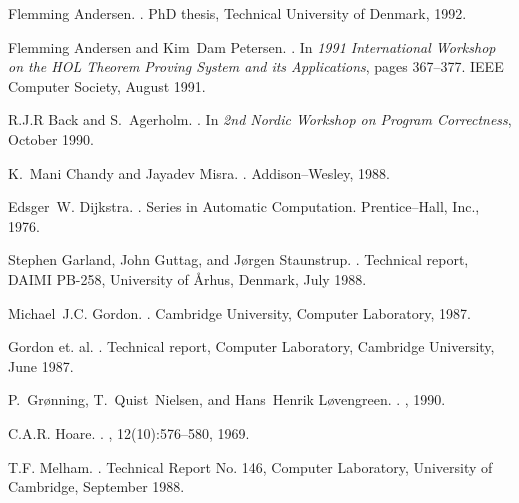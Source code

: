 \cleardoublepage
{}
\begin{thebibliography}{{Gor}87b}

Flemming Andersen.
.
\newblock PhD thesis, Technical University of Denmark, 1992.

Flemming Andersen and Kim~Dam Petersen.
.
\newblock In {\em {1991 International Workshop on the HOL Theorem Proving
  System and its Applications}}, pages 367--377. IEEE Computer Society, August
  1991.

R.J.R Back and S.~Agerholm.
.
\newblock In {\em {2nd Nordic Workshop on Program Correctness}}, October 1990.

K.~Mani Chandy and Jayadev Misra.
.
\newblock Addison--Wesley, 1988.

Edsger~W. Dijkstra.
.
\newblock Series in Automatic Computation. Prentice--Hall, Inc., 1976.

Stephen Garland, John Guttag, and J{\o}rgen Staunstrup.
.
\newblock Technical report, DAIMI PB-258, University of {\AA}rhus, Denmark,
  July 1988.

Michael~J.C. Gordon.
.
\newblock Cambridge University, Computer Laboratory, 1987.

{Gordon et. al.}
.
\newblock Technical report, Computer Laboratory, Cambridge University, June
  1987.

P.~Gr{\o}nning, T.~Quist~Nielsen, and Hans~Henrik L{\o}vengreen.
.
, 1990.

C.A.R. Hoare.
.
, 12(10):576--580, 1969.

T.F. Melham.
.
\newblock Technical Report No. 146, Computer Laboratory, University of
  Cambridge, September 1988.


\end{thebibliography}
